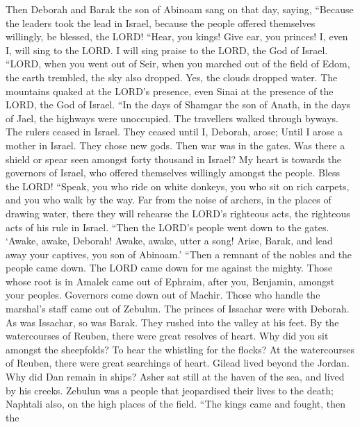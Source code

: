  Then Deborah and Barak the son of Abinoam sang on that
day, saying,  ``Because the leaders took the lead in
Israel, because the people offered themselves willingly, be blessed, the
LORD!  ``Hear, you kings! Give ear, you princes! I, even
I, will sing to the LORD. I will sing praise to the LORD, the God of
Israel.  ``LORD, when you went out of Seir, when you
marched out of the field of Edom, the earth trembled, the sky also
dropped. Yes, the clouds dropped water.  The mountains
quaked at the LORD's presence, even Sinai at the presence of the LORD,
the God of Israel.  ``In the days of Shamgar the son of
Anath, in the days of Jael, the highways were unoccupied. The travellers
walked through byways.  The rulers ceased in Israel. They
ceased until I, Deborah, arose; Until I arose a mother in Israel.
 They chose new gods. Then war was in the gates. Was there
a shield or spear seen amongst forty thousand in Israel? 
My heart is towards the governors of Israel, who offered themselves
willingly amongst the people. Bless the LORD!  ``Speak,
you who ride on white donkeys, you who sit on rich carpets, and you who
walk by the way.  Far from the noise of archers, in the
places of drawing water, there they will rehearse the LORD's righteous
acts, the righteous acts of his rule in Israel. ``Then the LORD's people
went down to the gates.  `Awake, awake, Deborah! Awake,
awake, utter a song! Arise, Barak, and lead away your captives, you son
of Abinoam.'  ``Then a remnant of the nobles and the
people came down. The LORD came down for me against the mighty.
 Those whose root is in Amalek came out of Ephraim, after
you, Benjamin, amongst your peoples. Governors come down out of Machir.
Those who handle the marshal's staff came out of Zebulun.
 The princes of Issachar were with Deborah. As was
Issachar, so was Barak. They rushed into the valley at his feet. By the
watercourses of Reuben, there were great resolves of heart.
 Why did you sit amongst the sheepfolds? To hear the
whistling for the flocks? At the watercourses of Reuben, there were
great searchings of heart.  Gilead lived beyond the
Jordan. Why did Dan remain in ships? Asher sat still at the haven of the
sea, and lived by his creeks.  Zebulun was a people that
jeopardised their lives to the death; Naphtali also, on the high places
of the field.  ``The kings came and fought, then the
